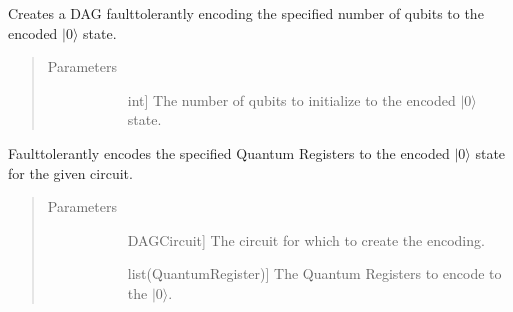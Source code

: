 \documentclass[letterpaper,10pt,english]{sphinxmanual}
\begin{document}
\begin{fulllineitems}
\begin{fulllineitems}
\label{\detokenize{Steane:Steane.SteaneFaultTolerantEncoder.createEncoderDag}}
\sphinxAtStartPar
Creates a DAG fault\sphinxhyphen{}tolerantly encoding the specified number of qubits to the encoded \(|0\rangle\) state.
\begin{quote}\begin{description}
\item[{Parameters}] \leavevmode\begin{description}
\item[{}] \leavevmode{[}int{]}
\sphinxAtStartPar
The number of qubits to initialize to the encoded \(|0\rangle\) state.

\end{description}

\end{description}\end{quote}

\end{fulllineitems}


\begin{fulllineitems}
\label{\detokenize{Steane:Steane.SteaneFaultTolerantEncoder.getEncoderCircuit}}
\sphinxAtStartPar
Fault\sphinxhyphen{}tolerantly encodes the specified Quantum Registers to the encoded \(|0\rangle\) state for the given circuit.
\begin{quote}\begin{description}
\item[{Parameters}] \leavevmode\begin{description}
\item[{}] \leavevmode{[}DAGCircuit{]}
\sphinxAtStartPar
The circuit for which to create the encoding.

\item[{}] \leavevmode{[}list(QuantumRegister){]}
\sphinxAtStartPar
The Quantum Registers to encode to the \(|0\rangle\).


\end{description}
\end{description}
\end{quote}
\end{fulllineitems}
\end{fulllineitems}
\end{document}
